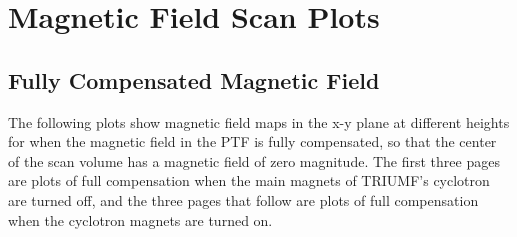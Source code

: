 \newpage
\section{Magnetic Field Scan Plots}
\label{Appendix:MagneticFieldScanPlots}

\subsection{Fully Compensated Magnetic Field}
\label{Appendix:PlotsofFullCompensation}

The following plots show magnetic field maps in the x-y plane at different heights for when the magnetic field in the PTF is fully compensated, so that the center of the scan volume has a magnetic field of zero magnitude. The first three pages are plots of full compensation when the main magnets of TRIUMF's cyclotron are turned off, and the three pages that follow are plots of full compensation when the cyclotron magnets are turned on. 

